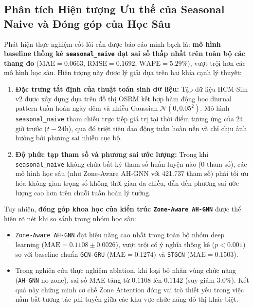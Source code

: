\subsection{Phân tích Hiện tượng Ưu thế của Seasonal Naive và Đóng góp của Học Sâu}

Phát hiện thực nghiệm cốt lõi cần được báo cáo minh bạch là: \textbf{mô hình baseline thống kê \texttt{seasonal\_naive} đạt sai số thấp nhất trên toàn bộ các thang đo} ($\text{MAE} = 0.0663$, $\text{RMSE} = 0.1692$, $\text{WAPE} = 5.29\%$), vượt trội hơn các mô hình học sâu. Hiện tượng này được lý giải dựa trên hai khía cạnh lý thuyết:

\begin{enumerate}
    \item \textbf{Đặc trưng tất định của thuật toán sinh dữ liệu:} Tập dữ liệu HCM-Sim v2 được xây dựng dựa trên đồ thị OSRM kết hợp hàm động học diurnal pattern tuần hoàn ngày đêm và nhiễu Gaussian $\mathcal{N}(0, 0.05^2)$. Mô hình \texttt{seasonal\_naive} tham chiếu trực tiếp giá trị tại thời điểm tương ứng của 24 giờ trước ($t - 24\text{h}$), qua đó triệt tiêu dao động tuần hoàn nền và chỉ chịu ảnh hưởng bởi phương sai nhiễu cục bộ.
    \item \textbf{Độ phức tạp tham số và phương sai ước lượng:} Trong khi \texttt{seasonal\_naive} không chứa bất kỳ tham số huấn luyện nào ($0$ tham số), các mô hình học sâu (như Zone-Aware AH-GNN với 421.737 tham số) phải tối ưu hóa không gian trọng số không-thời gian đa chiều, dẫn đến phương sai ước lượng cao hơn trên chuỗi tuần hoàn lý tưởng.
\end{enumerate}

Tuy nhiên, \textbf{đóng góp khoa học của kiến trúc \texttt{Zone-Aware AH-GNN}} được thể hiện rõ nét khi so sánh trong nhóm học sâu:
\begin{itemize}
    \item \texttt{Zone-Aware AH-GNN} đạt hiệu năng cao nhất trong toàn bộ nhóm deep learning ($\text{MAE} = 0.1108 \pm 0.0026$), vượt trội có ý nghĩa thống kê ($p < 0.001$) so với baseline chuẩn \texttt{GCN-GRU} ($\text{MAE} = 0.1274$) và \texttt{STGCN} ($\text{MAE} = 0.1503$).
    \item Trong nghiên cứu thực nghiệm ablation, khi loại bỏ nhãn vùng chức năng (\texttt{AH-GNN} no-zone), sai số MAE tăng từ $0.1108$ lên $0.1142$ (suy giảm $3.0\%$). Kết quả này chứng minh cơ chế Zone Attention đóng vai trò thiết yếu trong việc nắm bắt tương tác phi tuyến giữa các khu vực chức năng đô thị khác biệt.
\end{itemize}

